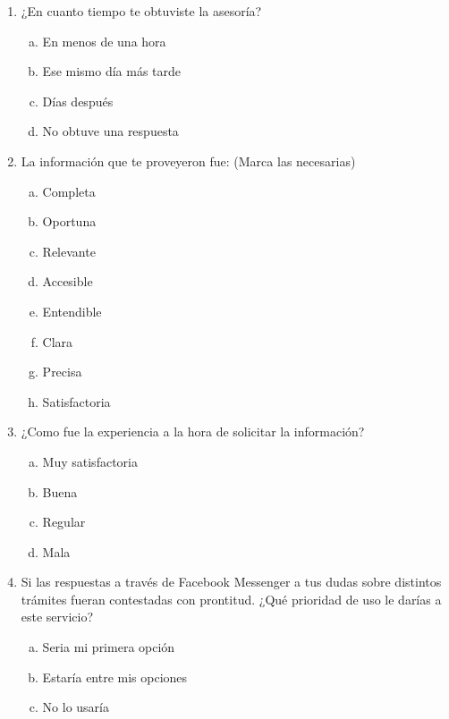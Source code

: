 \begin{multicols}{2}
\begin{enumerate}
                    \item ¿En cuanto tiempo te obtuviste la asesoría?
                    \begin{enumerate}[(a)]
                        \item En menos de una hora
                        \item Ese mismo día más tarde
                        \item Días después
                        \item No obtuve una respuesta
                    \end{enumerate}
                
                    \item La información que te proveyeron fue: (Marca las necesarias)
                    \begin{enumerate}[(a)]
                        \item Completa
                        \item Oportuna
                        \item Relevante
                        \item Accesible
                        \item Entendible
                        \item Clara
                        \item Precisa
                        \item Satisfactoria
                    \end{enumerate}
                
                    \item ¿Como fue la experiencia a la hora de solicitar la información?
                    \begin{enumerate}[(a)]
                        \item Muy satisfactoria 
                        \item Buena
                        \item Regular
                        \item Mala
                    \end{enumerate}
                    \item Si las respuestas a través de Facebook Messenger a tus dudas sobre distintos trámites fueran contestadas con prontitud. ¿Qué prioridad de uso le darías a este servicio?
                    \begin{enumerate}[(a)]
                        \item Seria mi primera opción
                        \item Estaría entre mis opciones
                        \item No lo usaría
                    \end{enumerate}
                \end{enumerate}
                
        \end{multicols}
    
